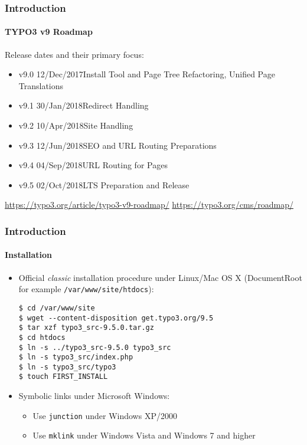 
\begin{frame}[fragile]
	\frametitle{Introduction}
	\framesubtitle{TYPO3 v9 Roadmap}

	Release dates and their primary focus:

	\begin{itemize}

		\item v9.0 \tabto{1.1cm}12/Dec/2017\tabto{3.4cm}Install Tool and Page Tree Refactoring,\newline
			\tabto{3.4cm}Unified Page Translations
		\item v9.1 \tabto{1.1cm}30/Jan/2018\tabto{3.4cm}Redirect Handling
		\item v9.2 \tabto{1.1cm}10/Apr/2018\tabto{3.4cm}Site Handling
        \item v9.3 \tabto{1.1cm}12/Jun/2018\tabto{3.4cm}SEO and URL Routing Preparations
		\item v9.4 \tabto{1.1cm}04/Sep/2018\tabto{3.4cm}URL Routing for Pages
        \item
			\begingroup
				\color{typo3orange}
                    v9.5 \tabto{1.1cm}02/Oct/2018\tabto{3.4cm}LTS Preparation and Release
			\endgroup

	\end{itemize}

	\smaller
		\url{https://typo3.org/article/typo3-v9-roadmap/}\newline
		\url{https://typo3.org/cms/roadmap/}
	\normalsize

\end{frame}


\begin{frame}[fragile]
	\frametitle{Introduction}
	\framesubtitle{Installation}

	\begin{itemize}
		\item Official \textit{classic} installation procedure under Linux/Mac OS X\newline
			(DocumentRoot for example \texttt{/var/www/site/htdocs}):
		\begin{lstlisting}
$ cd /var/www/site
$ wget --content-disposition get.typo3.org/9.5
$ tar xzf typo3_src-9.5.0.tar.gz
$ cd htdocs
$ ln -s ../typo3_src-9.5.0 typo3_src
$ ln -s typo3_src/index.php
$ ln -s typo3_src/typo3
$ touch FIRST_INSTALL
		\end{lstlisting}

		\item Symbolic links under Microsoft Windows:

			\begin{itemize}
				\item Use \texttt{junction} under Windows XP/2000
				\item Use \texttt{mklink} under Windows Vista and Windows 7 and higher
			\end{itemize}

	\end{itemize}
\end{frame}

